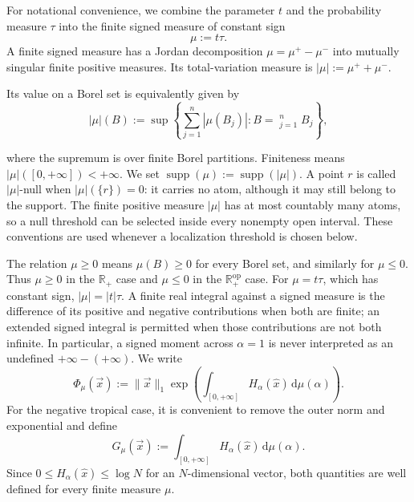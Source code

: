 \documentclass[aps,pra,11pt,onecolumn,nofootinbib,tightenlines]{revtex4-2}
\theoremstyle{definition}
\begin{document}
For notational convenience, we combine the parameter $t$ and the probability
measure $\tau$ into the finite signed measure of constant sign
\begin{equation}
 \mu:=t\tau.
 \label{eq:mu-equals-t-tau}
\end{equation}
A finite signed measure has a Jordan decomposition
$\mu=\mu^+-\mu^-$ into mutually singular finite positive measures.  Its
 total-variation measure is $|\mu|:=\mu^++\mu^-$.
\begin{samepage}
 Its value on a Borel set is equivalently given by
\begin{equation}
 |\mu|(B)
 :=\sup\left\{\sum_{j=1}^n|\mu(B_j)|:
 B=\mathop{\dot\bigcup}_{j=1}^nB_j\right\},
 \label{eq:total-variation-definition}
\end{equation}
\end{samepage}
where the supremum is over finite Borel partitions.  Finiteness means
$|\mu|([0,+\infty])<+\infty$.  We set
$\operatorname{supp}(\mu):=\operatorname{supp}(|\mu|)$.  A point $r$ is called
$|\mu|$-null when $|\mu|(\{r\})=0$: it carries no atom, although it may still
belong to the support.  The finite positive measure $|\mu|$ has at most
countably many atoms, so a null threshold can be selected inside every
nonempty open interval.  These
conventions are used whenever a localization threshold is chosen below.

The relation $\mu\geq0$ means $\mu(B)\geq0$ for every Borel set, and similarly
for $\mu\leq0$.  Thus $\mu\geq0$ in the $\mathbb R_+$ case and $\mu\leq0$ in the $\mathbb R_+^{\mathrm{op}}$ case.  For $\mu=t\tau$, which has constant
sign, $|\mu|=|t|\tau$.  A finite real integral against a signed measure is the
difference of its positive and negative contributions when both are finite;
an extended signed integral is permitted when those contributions are not
both infinite.  In particular, a signed moment
across $\alpha=1$ is never interpreted as an undefined $+\infty-(+\infty)$.
We write
\begin{equation}
 \Phi_\mu(\vec x)
 :=\|\vec x\|_1
 \exp\!\left(
   \int_{[0,+\infty]}H_\alpha(\widehat x)\,\mathrm d\mu(\alpha)
 \right).
 \label{eq:Phi-mu-necessary}
\end{equation}
For the negative tropical case, it is convenient to remove the outer norm and exponential and define
\begin{equation}
 G_\mu(\vec x)
 :=\int_{[0,+\infty]}H_\alpha(\widehat x)\,\mathrm d\mu(\alpha).
 \label{eq:G-mu-necessary}
\end{equation}
Since $0\leq H_\alpha(\widehat x)\leq\log N$ for an $N$-dimensional vector, both quantities are well defined for every finite measure $\mu$.
\end{document}
